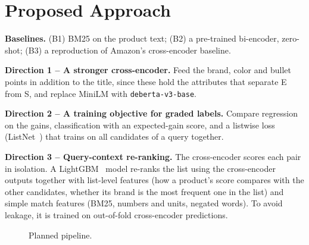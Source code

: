 \documentclass[11pt,a4paper]{article}
\begin{document}
\section{Proposed Approach}
\textbf{Baselines.} (B1) BM25 on the product text; (B2) a pre-trained bi-encoder, zero-shot; (B3) a reproduction of Amazon's cross-encoder baseline.

\noindent\textbf{Direction 1 -- A stronger cross-encoder.} Feed the brand, color and bullet points in addition to the title, since these hold the attributes that separate E from S, and replace MiniLM with \texttt{deberta-v3-base}.

\noindent\textbf{Direction 2 -- A training objective for graded labels.} Compare regression on the gains, classification with an expected-gain score, and a listwise loss (ListNet~\cite{listnet}) that trains on all candidates of a query together.

\noindent\textbf{Direction 3 -- Query-context re-ranking.} The cross-encoder scores each pair in isolation. A LightGBM~\cite{lightgbm} model re-ranks the list using the cross-encoder outputs together with list-level features (how a product's score compares with the other candidates, whether its brand is the most frequent one in the list) and simple match features (BM25, numbers and units, negated words). To avoid leakage, it is trained on out-of-fold cross-encoder predictions.

\begin{figure}[H]
\centering
{}
\caption{Planned pipeline.}
\end{figure}
\end{document}
